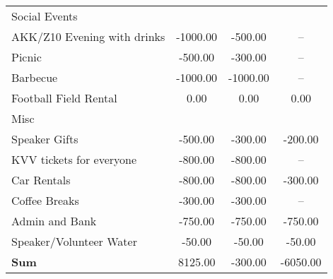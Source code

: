 \begin{tabularx}{\linewidth}{XSSS}
\hspace*{1em} Social Events  & {} & {} & {}\\
\hspace*{1em} \hspace*{1em} AKK/Z10 Evening with drinks & -1000.00 & -500.00 & {–}\\
\hspace*{1em} \hspace*{1em} Picnic & -500.00 & -300.00 & {–}\\
\hspace*{1em} \hspace*{1em} Barbecue & -1000.00 & -1000.00 & {–}\\
\hspace*{1em} \hspace*{1em} Football Field Rental & 0.00 & 0.00 & 0.00\\
\hspace*{1em} Misc  & {} & {} & {}\\
\hspace*{1em} \hspace*{1em} Speaker Gifts & -500.00 & -300.00 & -200.00\\
\hspace*{1em} \hspace*{1em} KVV tickets for everyone & -800.00 & -800.00 & {–}\\
\hspace*{1em} \hspace*{1em} Car Rentals & -800.00 & -800.00 & -300.00\\
\hspace*{1em} \hspace*{1em} Coffee Breaks & -300.00 & -300.00 & {–}\\
\hspace*{1em} \hspace*{1em} Admin and Bank & -750.00 & -750.00 & -750.00\\
\hspace*{1em} \hspace*{1em} Speaker/Volunteer Water & -50.00 & -50.00 & -50.00\\[0.5ex]\hline
\bf Sum \hspace*{1em}  & 8125.00 & -300.00 & -6050.00\\
\end{tabularx}

\newpage
